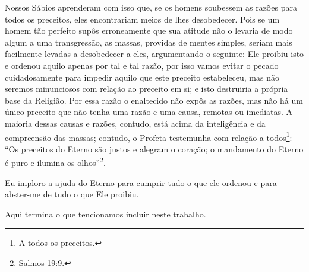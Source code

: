 Nossos Sábios aprenderam com isso que, se os homens soubessem as razões
para todos os preceitos, eles encontrariam meios de lhes desobedecer.
Pois se um homem tão perfeito supôs erroneamente que sua atitude não o
levaria de modo algum a uma transgressão, as massas, providas de mentes
simples, seriam mais facilmente levadas a desobedecer a eles,
argumentando o seguinte: Ele proibiu isto e ordenou aquilo apenas por
tal e tal razão, por isso vamos evitar o pecado cuidadosamente para
impedir aquilo que este preceito estabeleceu, mas não seremos
minunciosos com relação ao preceito em si; e isto destruiria a própria
base da Religião. Por essa razão o enaltecido não expôs as razões, mas
não há um único preceito que não tenha uma razão e uma causa, remotas ou
imediatas. A maioria dessas causas e razões, contudo, está acima da
inteligência e da compreensão das massas; contudo, o Profeta testemunha com relação a
todos\footnote{A todos os preceitos.}: ``Os preceitos do Eterno são justos e
alegram o coração; o mandamento do Eterno é puro e ilumina os
olhos''\footnote{Salmos 19:9.}.

Eu imploro a ajuda do Eterno para cumprir tudo o que ele ordenou
e para abster-me de tudo o que Ele proibiu.

Aqui termina o que tencionamos incluir neste trabalho.


